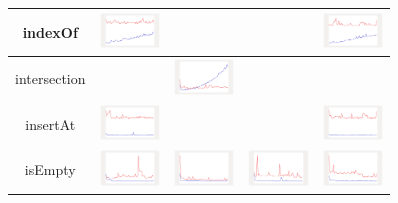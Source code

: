\begin{longtable}{ c|c c c c}
indexOf
&
\includegraphics[width=1.6cm]{graphs/sequence/small/IndexOf}
&
&
&
\includegraphics[width=1.6cm]{graphs/orderedset/small/IndexOf}
\\\hline

intersection
&
&
\includegraphics[width=1.6cm]{graphs/set/small/Intersection}
&
&
\\\hline

insertAt
&
\includegraphics[width=1.6cm]{graphs/sequence/small/InsertAt}
&
&
&
\includegraphics[width=1.6cm]{graphs/orderedset/small/InsertAt}
\\\hline

isEmpty
&
\includegraphics[width=1.6cm]{graphs/sequence/small/IsEmpty}
&
\includegraphics[width=1.6cm]{graphs/set/small/IsEmpty}
&
\includegraphics[width=1.6cm]{graphs/bag/small/IsEmpty}
&
\includegraphics[width=1.6cm]{graphs/orderedset/small/IsEmpty}
\\\hline


\end{longtable}
